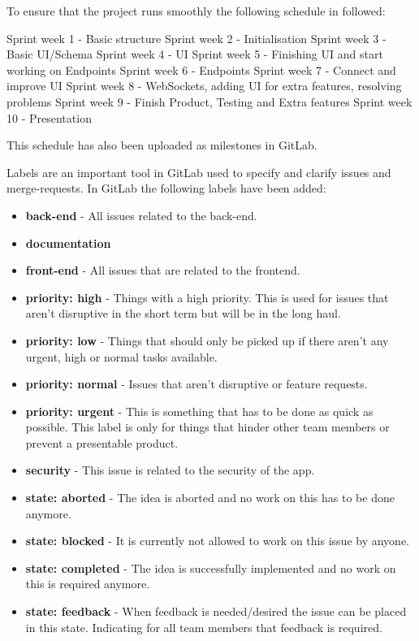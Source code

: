 \documentclass[sigconf,nonacm]{acmart}
\begin{document}
To ensure that the project runs smoothly the following schedule in followed:

Sprint week 1 - Basic structure
Sprint week 2 - Initialisation
Sprint week 3 - Basic UI/Schema
Sprint week 4 - UI
Sprint week 5 - Finishing UI and start working on Endpoints
Sprint week 6 - Endpoints
Sprint week 7 - Connect and improve UI
Sprint week 8 - WebSockets, adding UI for extra features, resolving problems
Sprint week 9 - Finish Product, Testing and Extra features
Sprint week 10 - Presentation

This schedule has also been uploaded as milestones in GitLab.

Labels are an important tool in GitLab used to specify and clarify issues and merge-requests. In GitLab the following labels have been added:

\begin{itemize}
    \item \textbf{back-end}             - All issues related to the back-end.
    \item \textbf{documentation}
    \item \textbf{front-end}            - All issues that are related to the frontend.
    \item \textbf{priority: high}       - Things with a high priority. This is used for issues that aren't disruptive in the short term but will be in the long haul.
    \item \textbf{priority: low}        - Things that should only be picked up if there aren't any urgent, high or normal tasks available.
    \item \textbf{priority: normal}     - Issues that aren't disruptive or feature requests.
    \item \textbf{priority: urgent}     - This is something that has to be done as quick as possible. This label is only for things that hinder other team members or prevent a presentable product.
    \item \textbf{security}             - This issue is related to the security of the app.
    \item \textbf{state: aborted}       - The idea is aborted and no work on this has to be done anymore.
    \item \textbf{state: blocked}       - It is currently not allowed to work on this issue by anyone.
    \item \textbf{state: completed}     - The idea is successfully implemented and no work on this is required anymore.
    \item \textbf{state: feedback}      - When feedback is needed/desired the issue can be placed in this state. Indicating for all team members that feedback is required.

\end{itemize}
\end{document}
